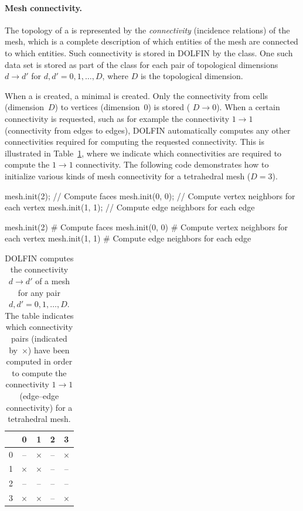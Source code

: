\paragraph{Mesh connectivity.}

The topology of a  is represented by the \emph{connectivity}
(incidence relations) of the mesh, which is a complete description of
which entities of the mesh are connected to which entities. Such
connectivity is stored in DOLFIN by the 
class. One such data set is stored as part of the class
 for each pair of topological dimensions $d
\rightarrow d'$ for $d, d' = 0, 1, \ldots, D$, where $D$ is the
topological dimension.

When a  is created, a minimal  is created.
Only the connectivity from cells (dimension~$D$) to vertices
(dimension~$0$) is stored ( $D \rightarrow 0$).
When a certain connectivity is requested, such as for example the connectivity
$1 \rightarrow 1$ (connectivity from edges to edges), DOLFIN automatically
computes any other connectivities required for computing the requested
connectivity. This is illustrated in Table~\ref{tab:logg-2:connectivity},
where we indicate which connectivities are required to compute the $1
\rightarrow 1$ connectivity.  The following code demonstrates how to
initialize various kinds of mesh connectivity for a tetrahedral mesh
($D = 3$).
\begin{c++}
mesh.init(2);    // Compute faces
mesh.init(0, 0); // Compute vertex neighbors for each vertex
mesh.init(1, 1); // Compute edge neighbors for each edge
\end{c++}
\begin{python}
mesh.init(2)      # Compute faces
mesh.init(0, 0)   # Compute vertex neighbors for each vertex
mesh.init(1, 1)   # Compute edge neighbors for each edge
\end{python}

\begin{table}
  \begin{center}
    \begin{tabular}{c|cccc}
      & 0 & 1 & 2 & 3 \\
      \hline
      0 & -- & $\times$ & -- & $\times$ \\
      1 & $\times$ & $\times$ & -- & -- \\
      2 & -- & -- & -- & -- \\
      3 & $\times$ & $\times$ & -- & $\times$ \\
    \end{tabular}
  \end{center}
  \caption{DOLFIN computes the connectivity $d \rightarrow d'$ of a
    mesh for any pair $d, d' = 0, 1, \ldots, D$. The table
    indicates which connectivity pairs (indicated by~$\times$) have
    been computed in order to compute the connectivity $1 \rightarrow
    1$ (edge--edge connectivity) for a tetrahedral mesh.}
\label{tab:logg-2:connectivity}
\end{table}

